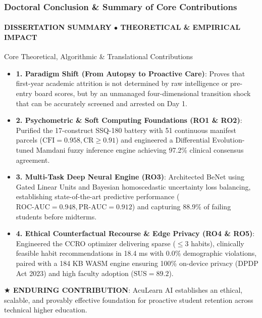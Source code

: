 \documentclass[aspectratio=169, 10pt]{beamer}
\newcommand{\leadbullet}[2]{\textbf{\color{NavyDark}#1}: \color{TextBody}#2}
\begin{document}
\begin{frame}
  \frametitle{Doctoral Conclusion \& Summary of Core Contributions}
  \framesubtitle{DISSERTATION SUMMARY $\bullet$ THEORETICAL \& EMPIRICAL IMPACT}

  \begin{defensecard}{Core Theoretical, Algorithmic \& Translational Contributions}
    \begin{itemize}\setlength{\itemsep}{2.5pt}\setlength{\parskip}{0pt}\fontsize{8.2pt}{10.2pt}\selectfont
      \item \leadbullet{1. Paradigm Shift (From Autopsy to Proactive Care)}{Proves that first-year academic attrition is not determined by raw intelligence or pre-entry board scores, but by an unmanaged four-dimensional transition shock that can be accurately screened and arrested on Day 1.}
      \item \leadbullet{2. Psychometric \& Soft Computing Foundations (RO1 \& RO2)}{Purified the 17-construct SSQ-180 battery with 51 continuous manifest parcels ($\text{CFI}=0.958, \text{CR}\ge 0.91$) and engineered a Differential Evolution-tuned Mamdani fuzzy inference engine achieving 97.2\% clinical consensus agreement.}
      \item \leadbullet{3. Multi-Task Deep Neural Engine (RO3)}{Architected BeNet using Gated Linear Units and Bayesian homoscedastic uncertainty loss balancing, establishing state-of-the-art predictive performance ($\text{ROC-AUC} = 0.948, \text{PR-AUC} = 0.912$) and capturing 88.9\% of failing students before midterms.}
      \item \leadbullet{4. Ethical Counterfactual Recourse \& Edge Privacy (RO4 \& RO5)}{Engineered the CCRO optimizer delivering sparse ($\le 3$ habits), clinically feasible habit recommendations in 18.4 ms with 0.0\% demographic violations, paired with a 184 KB WASM engine ensuring 100\% on-device privacy (DPDP Act 2023) and high faculty adoption ($\text{SUS} = 89.2$).}
    \end{itemize}
  \end{defensecard}
  \vspace{-0.1cm}

  \begin{takeawaybanner}
    \textbf{\color{GoldPill}$\bigstar$ ENDURING CONTRIBUTION}: AcuLearn AI establishes an ethical, scalable, and provably effective foundation for proactive student retention across technical higher education.
  \end{takeawaybanner}
\end{frame}
\end{document}
